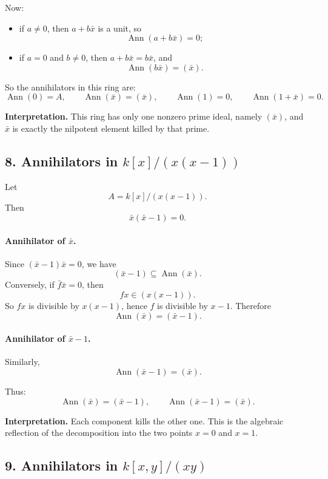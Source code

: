 \documentclass[12pt,a4paper,oneside]{report}
\DeclareMathOperator{\Ann}{Ann}
\theoremstyle{notespace}
\begin{document}
	Now:
	\begin{itemize}
		\item if \(a\neq 0\), then \(a+b\bar x\) is a unit, so
		\[
		\Ann(a+b\bar x)=0;
		\]
		\item if \(a=0\) and \(b\neq 0\), then \(a+b\bar x=b\bar x\), and
		\[
		\Ann(b\bar x)=(\bar x).
		\]
	\end{itemize}
	
	So the annihilators in this ring are:
	\[
	\Ann(0)=A,\qquad \Ann(\bar x)=(\bar x),\qquad \Ann(1)=0,\qquad \Ann(1+\bar x)=0.
	\]
	
	\medskip
	
	\noindent
	\textbf{Interpretation.}
	This ring has only one nonzero prime ideal, namely \((\bar x)\), and \(\bar x\) is exactly the nilpotent element killed by that prime.
	
	\subsection{8. Annihilators in \(k[x]/(x(x-1))\)}
	
	Let
	\[
	A=k[x]/(x(x-1)).
	\]
	Then
	\[
	\bar x(\bar x-1)=0.
	\]
	
	\paragraph{Annihilator of \(\bar x\).}
	Since \((\bar x-1)\bar x=0\), we have
	\[
	(\bar x-1)\subseteq \Ann(\bar x).
	\]
	Conversely, if \(\bar f\bar x=0\), then
	\[
	fx\in (x(x-1)).
	\]
	So \(fx\) is divisible by \(x(x-1)\), hence \(f\) is divisible by \(x-1\). Therefore
	\[
	\Ann(\bar x)=(\bar x-1).
	\]
	
	\paragraph{Annihilator of \(\bar x-1\).}
	Similarly,
	\[
	\Ann(\bar x-1)=(\bar x).
	\]
	
	Thus:
	\[
	\Ann(\bar x)=(\bar x-1),\qquad \Ann(\bar x-1)=(\bar x).
	\]
	
	\medskip
	
	\noindent
	\textbf{Interpretation.}
	Each component kills the other one. This is the algebraic reflection of the decomposition into the two points \(x=0\) and \(x=1\).
	
	\subsection{9. Annihilators in \(k[x,y]/(xy)\)}
	
\end{document}

